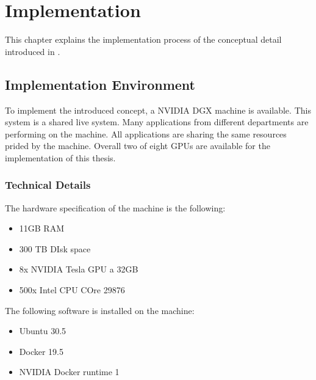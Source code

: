 \chapter{Implementation}
\label{chap:06_implementation}

This chapter explains the implementation process of the conceptual detail introduced in .


\section{Implementation Environment}
To implement the introduced concept, a NVIDIA DGX machine is available.
This system is a shared live system. Many applications from different departments are performing on the machine. All applications are sharing the same resources prided by the machine.
Overall two of eight GPUs are available for the implementation of this thesis.


\subsection{Technical Details}
The hardware specification of the machine is the following:
\begin{itemize}
\item 11GB RAM
\item 300 TB DIsk space 
\item 8x NVIDIA Tesla GPU a 32GB
\item 500x Intel CPU COre 29876
\end{itemize}


The following software is installed on the machine:
\begin{itemize}
\item Ubuntu 30.5
\item Docker 19.5
\item NVIDIA Docker runtime 1
\end{itemize}


